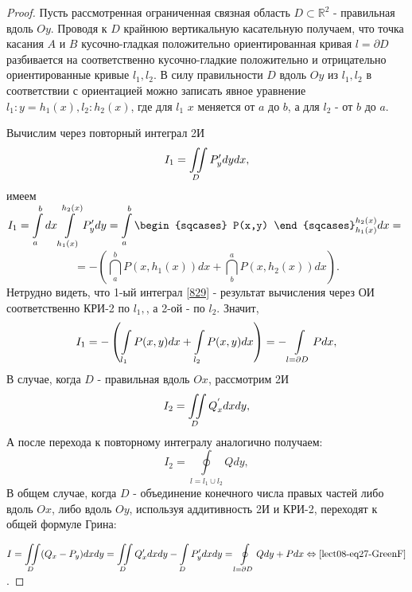 \begin{proof}
	Пусть рассмотренная ограниченная связная область $D \subset \mathbb{R}^2$ - правильная вдоль $Oy$. Проводя к $D$ крайнюю вертикальную касательную получаем, что точка касания $A$ и $B$ кусочно-гладкая положительно ориентированная кривая $l = \partial D$ разбивается на соответственно кусочно-гладкие положительно и отрицательно ориентированные кривые $l_1, l_2$. В силу правильности $D$ вдоль $Oy$ из $l_1, l_2$ в соответствии с ориентацией можно записать явное уравнение $l_1 : y = h_1(x), l_2: h_2(x)$, где для $l_1$ $x$ меняется от $a$ до $b$, а для $l_2$ - от $b$ до $a$. 
	
	Вычислим через повторный интеграл 2И
	\begin{equation}
	\label{828}
	I_1 = \displaystyle\iint\limits_D P'_y dy dx,
	\end{equation} 
	имеем $I_1 = \dint\limits_a^b dx \dint\limits_{h_1(x)}^{h_2(x)} P'_y dy = \dint\limits_a^b \begin{sqcases} P(x,y) \end{sqcases}_{h_1(x)}^{h_2(x)} dx = $
	\begin{equation}
	\label{829}
	= - \left( \dint\limits_a^b P(x, h_1(x))dx + \dint\limits_b^a P(x, h_2(x)) dx \right).
	\end{equation}
	Нетрудно видеть, что 1-ый интеграл \eqref{829} - результат вычисления через ОИ соответственно КРИ-2 по $l_1,$, а 2-ой - по $l_2$. Значит,
	\begin{equation}
	\label{830}
	I_1 = - \left(  \displaystyle\int\limits\limits_{l_1} P(x, y)dx + \displaystyle\int\limits\limits_{l_2} P(x, y) dx \right) = - \displaystyle\int\limits\limits_{l = \partial D} P dx,
	\end{equation}
	В случае, когда $D$ - правильная вдоль $Ox$, рассмотрим 2И
	\begin{equation}
	\label{831}
	I_2 = \displaystyle\iint\limits_D Q_x^{'} dx dy,
	\end{equation}
	А после перехода к повторному интегралу аналогично получаем:
	\begin{equation}
	\label{832}
	I_2 = \oint\limits_{l = l_1 \cup l_2} Q dy,
	\end{equation}
	В общем случае, когда $D$ - объединение конечного числа правых частей либо вдоль $Ox$, либо вдоль $Oy$, используя аддитивность 2И и КРИ-2, переходят к общей формуле Грина: 
	
	$I = \displaystyle\iint\limits_D (Q_x - P_y )dx dy = \displaystyle\iint\limits_D Q'_x dx dy - \displaystyle\int\limits_D P'_y dx dy = \oint\limits_{l = \partial D} Qdy + Pdx \Leftrightarrow \eqref{lect08-eq27-GreenF}$.
\end{proof} 

